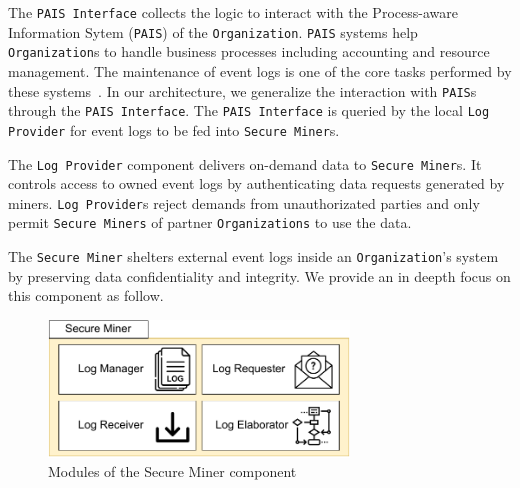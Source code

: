 The \texttt{PAIS Interface} collects the logic to interact with the Process-aware Information Sytem (\texttt{PAIS}) of the \texttt{Organization}. \texttt{PAIS} systems help \texttt{Organization}s to handle business processes including accounting and resource management. The maintenance of event logs is one of the core tasks performed by these systems~\cite{Dumas.etal/2018:FundamentalsofBPM}. In our architecture, we generalize the interaction with \texttt{PAIS}s through the \texttt{PAIS Interface}. The \texttt{PAIS Interface} is queried by the local \texttt{Log Provider} for event logs to be fed into \texttt{Secure Miner}s. 


The \texttt{Log Provider} component delivers on-demand data to \texttt{Secure Miner}s. %
It controls access to owned event logs by authenticating data requests generated by miners. \texttt{Log Provider}s reject demands from unauthorizated parties and only permit \texttt{Secure Miners} of partner \texttt{Organizations} to use the data.    %

The \texttt{Secure Miner} shelters external event logs inside an \texttt{Organization}'s system by preserving data confidentiality and integrity. We provide an in deepth focus on this component as follow.

\begin{figure}[t]
\centering
\includegraphics[width=8cm]{content/figures/secure_miner.pdf}
\caption{Modules of the Secure Miner component}
\label{fig:trusted_miner}
\end{figure}




